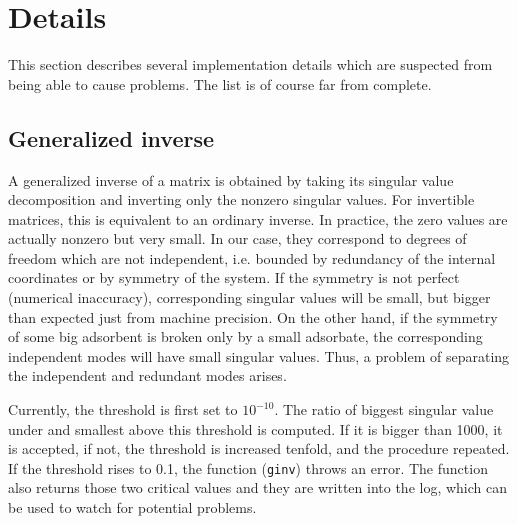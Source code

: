 \documentclass[12pt,a4]{article}
\begin{document}
\section{Details}

This section describes several implementation details which are suspected from being able to cause problems. The list is of course far from complete.

\subsection{Generalized inverse}

A generalized inverse of a matrix is obtained by taking its singular value decomposition and inverting only the nonzero singular values. For invertible matrices, this is equivalent to an ordinary inverse. In practice, the zero values are actually nonzero but very small. In our case, they correspond to degrees of freedom which are not independent, i.e. bounded by redundancy of the internal coordinates or by symmetry of the system. If the symmetry is not perfect (numerical inaccuracy), corresponding singular values will be small, but bigger than expected just from machine precision. On the other hand, if the symmetry of some big adsorbent is broken only by a small adsorbate, the corresponding independent modes will have small singular values. Thus, a problem of separating the independent and redundant modes arises.

Currently, the threshold is first set to $10^{-10}$. The ratio of biggest singular value under and smallest above this threshold is computed. If it is bigger than 1000, it is accepted, if not, the threshold is increased tenfold, and the procedure repeated. If the threshold rises to 0.1, the function (\texttt{ginv}) throws an error. The function also returns those two critical values and they are written into the log, which can be used to watch for potential problems.
	
\end{document}

